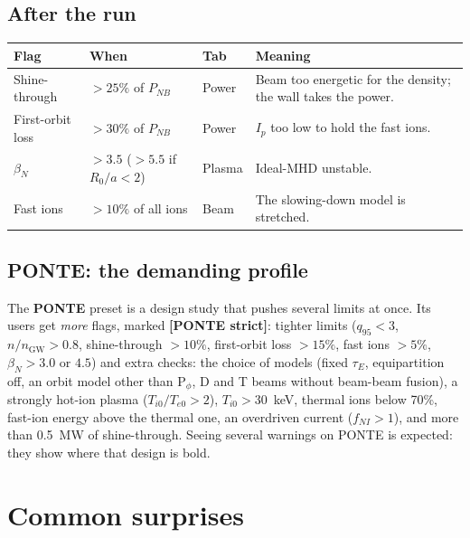 \documentclass[11pt,a4paper]{article}
\newcommand{\ui}[1]{\textsf{\textbf{#1}}}
\begin{document}
\subsection{After the run}
\begin{center}
\renewcommand{\arraystretch}{1.3}
\begin{tabularx}{\textwidth}{l l l X}
\toprule
\textbf{Flag} & \textbf{When} & \textbf{Tab} & \textbf{Meaning} \\
\midrule
Shine-through & $>25\%$ of $P_{NB}$ & Power & Beam too energetic for the density; the wall takes the power. \\
First-orbit loss & $>30\%$ of $P_{NB}$ & Power & $I_p$ too low to hold the fast ions. \\
$\beta_N$ & $>3.5$ ($>5.5$ if $R_0/a<2$) & Plasma & Ideal-MHD unstable. \\
Fast ions & $>10\%$ of all ions & Beam & The slowing-down model is stretched. \\
\bottomrule
\end{tabularx}
\end{center}

\subsection{PONTE: the demanding profile}
The \ui{PONTE} preset is a design study that pushes several limits at once.
Its users get \emph{more} flags, marked \textbf{[PONTE strict]}: tighter limits
($q_{95}<3$, $n/n_{\mathrm{GW}}>0.8$, shine-through $>10\%$, first-orbit loss
$>15\%$, fast ions $>5\%$, $\beta_N > 3.0$ or $4.5$) and extra checks: the choice
of models (fixed $\tau_E$, equipartition off, an orbit model other than
P$_\phi$, D and T beams without beam-beam fusion), a strongly hot-ion plasma
($T_{i0}/T_{e0}>2$), $T_{i0}>30$~keV, thermal ions below 70\%, fast-ion
energy above the thermal one, an overdriven current ($f_{NI}>1$), and more
than 0.5~MW of shine-through. Seeing several warnings on PONTE is expected:
they show where that design is bold.

\section{Common surprises}\label{sec:surprises}
\end{document}
